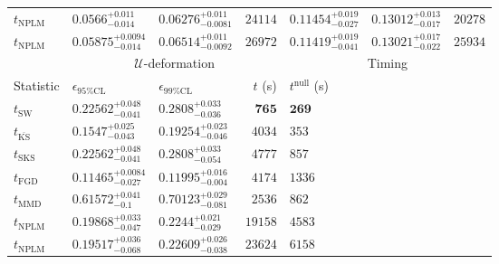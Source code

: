 \begin{tabular}{l|llr|llr}
\rowcolor{red!35}	$t_{\mathrm{NPLM}}$ & $0.0566_{-0.014}^{+0.011}$ & $0.06276_{-0.0081}^{+0.011}$ & $24114$ & $0.11454_{-0.027}^{+0.019}$ & $0.13012_{-0.017}^{+0.013}$ & $20278$ \\
\rowcolor{blue!35}	$t_{\mathrm{NPLM}}$ & $0.05875_{-0.014}^{+0.0094}$ & $0.06514_{-0.0092}^{+0.011}$ & $26972$ & $0.11419_{-0.041}^{+0.019}$ & $0.13021_{-0.022}^{+0.017}$ & $25934$ \\
	\toprule
	\multicolumn{1}{c}{} & \multicolumn{3}{c}{$\mathcal{U}$-deformation} & \multicolumn{3}{c}{Timing} \\
Statistic & $\epsilon_{95\%\mathrm{CL}}$ & $\epsilon_{99\%\mathrm{CL}}$ & $t$ (s) & $t^{\mathrm{null}}$ (s) \\
	\midrule
	$t_{\mathrm{SW}}$ & $0.22562_{-0.041}^{+0.048}$ & $0.2808_{-0.036}^{+0.033}$ & ${\mathbf{765}}$ & ${\mathbf{269}}$ \\
	$t_{\overline{\mathrm{KS}}}$ & $0.1547_{-0.043}^{+0.025}$ & $0.19254_{-0.046}^{+0.023}$ & $4034$ & $353$ \\
	$t_{\mathrm{SKS}}$ & $0.22562_{-0.041}^{+0.048}$ & $0.2808_{-0.054}^{+0.033}$ & $4777$ & $857$ \\
	$t_{\mathrm{FGD}}$ & ${\mathbf{0.11465_{-0.027}^{+0.0084}}}$ & ${\mathbf{0.11995_{-0.004}^{+0.016}}}$ & $4174$ & $1336$ \\
	$t_{\mathrm{MMD}}$ & $0.61572_{-0.1}^{+0.041}$ & $0.70123_{-0.081}^{+0.029}$ & $2536$ & $862$ \\
\rowcolor{red!35}	$t_{\mathrm{NPLM}}$ & $0.19868_{-0.047}^{+0.033}$ & $0.2244_{-0.029}^{+0.021}$ & $19158$ & $4583$ \\
\rowcolor{blue!35}	$t_{\mathrm{NPLM}}$ & $0.19517_{-0.068}^{+0.036}$ & $0.22609_{-0.038}^{+0.026}$ & $23624$ & $6158$ \\
	\bottomrule
\end{tabular}